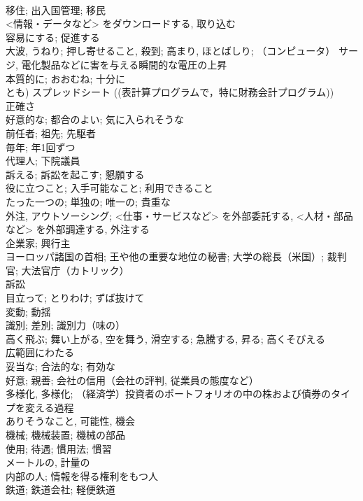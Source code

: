 \documentclass[8pt]{extreport}
\begin{document}
\begin{CJK}{UTF8}{min}
\\	移住; 出入国管理; 移民	
\\	<情報・データなど> をダウンロードする, 取り込む	
\\	容易にする; 促進する	
\\	大波, うねり; 押し寄せること, 殺到; 高まり, ほとばしり; （コンピュータ） サージ, 電化製品などに害を与える瞬間的な電圧の上昇	
\\	本質的に; おおむね; 十分に	
\\	とも) スプレッドシート ((表計算プログラムで，特に財務会計プログラム))	
\\	正確さ	
\\	好意的な; 都合のよい; 気に入られそうな	
\\	前任者; 祖先; 先駆者	
\\	毎年; 年1回ずつ	
\\	代理人; 下院議員	
\\	訴える; 訴訟を起こす; 懇願する	
\\	役に立つこと; 入手可能なこと; 利用できること	
\\	たった一つの; 単独の; 唯一の; 貴重な	
\\	外注, アウトソーシング; <仕事・サービスなど> を外部委託する, <人材・部品など> を外部調達する, 外注する	
\\	企業家; 興行主	
\\	ヨーロッパ諸国の首相; 王や他の重要な地位の秘書; 大学の総長（米国）; 裁判官; 大法官庁（カトリック）	
\\	訴訟	
\\	目立って; とりわけ; ずば抜けて	
\\	変動; 動揺	
\\	識別; 差別; 識別力（味の）	
\\	高く飛ぶ; 舞い上がる, 空を舞う, 滑空する; 急騰する, 昇る; 高くそびえる	
\\	広範囲にわたる	
\\	妥当な; 合法的な; 有効な	
\\	好意; 親善; 会社の信用（会社の評判, 従業員の態度など）	
\\	多様化, 多様化; （経済学）投資者のポートフォリオの中の株および債券のタイプを変える過程	
\\	ありそうなこと, 可能性, 機会	
\\	機械; 機械装置; 機械の部品	
\\	使用; 待遇; 慣用法; 慣習	
\\	メートルの, 計量の	
\\	内部の人; 情報を得る権利をもつ人	
\\	鉄道; 鉄道会社; 軽便鉄道	

\end{CJK}
\end{document}
